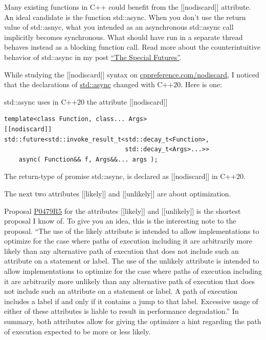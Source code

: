 \begin{tcolorbox}[colback=red!5!white,colframe=red!75!black,title={The issue with std::async}]
Many existing functions in C++ could benefit from the [[nodiscard]] attribute. An ideal candidate is the function std::async. When you don’t use the return value of std::asnyc, what you intended as an asynchronous std::async call implicitly becomes synchronous. What should have run in a separate thread behaves instead as a blocking function call. Read more about the counterintuitive behavior of std::async in my post \href{https://www.modernescpp.com/index.php/the-special-futures}{“The Special Futures”}.

While studying the [[nodiscard]] syntax on \href{https://en.cppreference.com/w/cpp/language/attributes/nodiscard}{cppreference.com/nodiscard}, I noticed that the declarations of \href{https://en.cppreference.com/w/cpp/thread/async}{std::async} changed with C++20. Here is one:

\noindent
std::async uses in C++20 the attribute [[nodiscard]]
\begin{lstlisting}[style=styleCXX]
template<class Function, class... Args>
[[nodiscard]]
std::future<std::invoke_result_t<std::decay_t<Function>,
								 std::decay_t<Args>...>>
	async( Function&& f, Args&&... args );
\end{lstlisting}

The return-type of promise std::async, is declared as [[nodiscard]] in C++20.
	
\end{tcolorbox}

The next two attributes [[likely]] and [[unlikely]] are about optimization.


Proposal \href{http://www.open-std.org/jtc1/sc22/wg21/docs/papers/2018/p0479r5.html}{P0479R5} for the attributes [[likely]] and [[unlikely]] is the shortest proposal I know of. To give you an idea, this is the interesting note to the proposal. “The use of the likely attribute is intended to allow implementations to optimize for the case where paths of execution including it are arbitrarily more likely than any alternative path of execution that does not include such an attribute on a statement or label. The use of the unlikely attribute is intended to allow implementations to optimize for the case where paths of execution including it are arbitrarily more unlikely than any alternative path of execution that does not include such an attribute on a statement or label. A path of execution includes a label if and only if it contains a jump to that label. Excessive usage of either of these attributes is liable to result in performance degradation.” In summary, both attributes allow for giving the optimizer a hint regarding the path of execution expected to be more or less likely.

